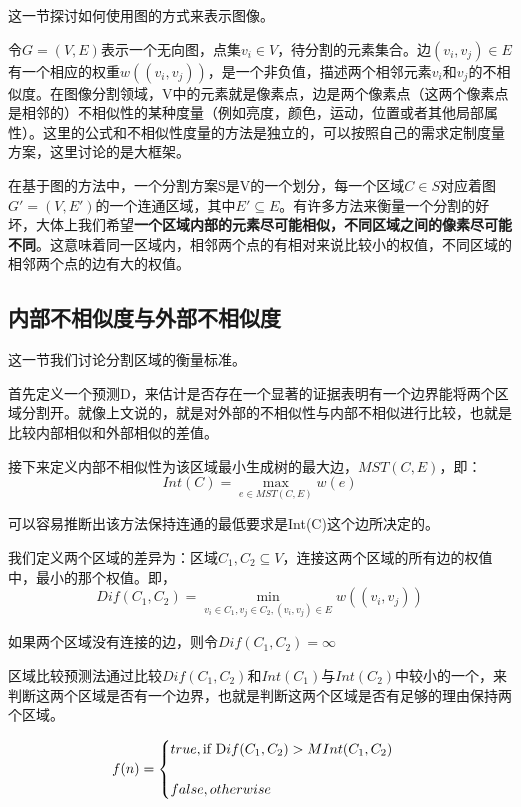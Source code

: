 这一节探讨如何使用图的方式来表示图像。

令\(G=(V,E)\)表示一个无向图，点集\(v_i \in V\)，待分割的元素集合。边\((v_i,v_j) \in E\)有一个相应的权重\(w((v_i,v_j))\)，是一个非负值，描述两个相邻元素\(v_i\)和\(v_j\)的不相似度。在图像分割领域，V中的元素就是像素点，边是两个像素点（这两个像素点是相邻的）不相似性的某种度量（例如亮度，颜色，运动，位置或者其他局部属性）。这里的公式和不相似性度量的方法是独立的，可以按照自己的需求定制度量方案，这里讨论的是大框架。

在基于图的方法中，一个分割方案S是V的一个划分，每一个区域\(C \in S\)对应着图
\(G' = (V,E')\)的一个连通区域，其中\(E' \subseteq E\)。有许多方法来衡量一个分割的好坏，大体上我们希望\textbf{一个区域内部的元素尽可能相似，不同区域之间的像素尽可能不同}。这意味着同一区域内，相邻两个点的有相对来说比较小的权值，不同区域的相邻两个点的边有大的权值。

\subsection{内部不相似度与外部不相似度}

这一节我们讨论分割区域的衡量标准。

首先定义一个预测D，来估计是否存在一个显著的证据表明有一个边界能将两个区域分割开。就像上文说的，就是对外部的不相似性与内部不相似进行比较，也就是比较内部相似和外部相似的差值。

接下来定义内部不相似性为该区域最小生成树的最大边，\(MST(C,E)\)，即：
\begin{equation}
Int(C) = \mathop {\max }\limits_{e \in MST(C,E)}w(e)
\end{equation}

可以容易推断出该方法保持连通的最低要求是Int(C)这个边所决定的。

我们定义两个区域的差异为：区域\(C_1,C_2 \subseteq V\)，连接这两个区域的所有边的权值中，最小的那个权值。即，
\begin{equation}
Dif(C_1,C_2) = \mathop {\min }\limits_{v_i \in C_1 ,v_j \in C_2, (v_i,v_j) \in E}w((v_i,v_j))
\end{equation}

如果两个区域没有连接的边，则令\(Dif(C_1,C_2) = \infty\)

区域比较预测法通过比较\(Dif(C_1,C_2)\)和\(Int(C_1)\)与\(Int(C_2)\)中较小的一个，来判断这两个区域是否有一个边界，也就是判断这两个区域是否有足够的理由保持两个区域。

\begin{equation}
f(n) =\begin{cases} 
true,   \mbox {if } \mbox Dif(C_1,C_2) > M Int(C_1,C_2)\\\\
false,  otherwise \end{cases}
\end{equation}

